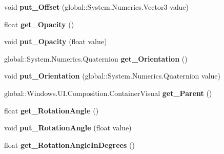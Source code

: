 \begin{DoxyCompactItemize}
void {\bfseries put\+\_\+\+Offset} (global\+::\+System.\+Numerics.\+Vector3 value)
\item 
\mbox{\label{interface_windows_1_1_u_i_1_1_composition_1_1_i_visual_ac8734d1872440f36e957ad510227446a}} 
float {\bfseries get\+\_\+\+Opacity} ()
\item 
\mbox{\label{interface_windows_1_1_u_i_1_1_composition_1_1_i_visual_ad61a737c8ccc4148e0134f10292f5708}} 
void {\bfseries put\+\_\+\+Opacity} (float value)
\item 
\mbox{\label{interface_windows_1_1_u_i_1_1_composition_1_1_i_visual_a523dd4814f2f36f236cfe45314be2dd0}} 
global\+::\+System.\+Numerics.\+Quaternion {\bfseries get\+\_\+\+Orientation} ()
\item 
\mbox{\label{interface_windows_1_1_u_i_1_1_composition_1_1_i_visual_ac0ab83605b6773e888073ad16337ad3f}} 
void {\bfseries put\+\_\+\+Orientation} (global\+::\+System.\+Numerics.\+Quaternion value)
\item 
\mbox{\label{interface_windows_1_1_u_i_1_1_composition_1_1_i_visual_a134bed2c4c5639f5afd9a8ea755bd39a}} 
global\+::\+Windows.\+U\+I.\+Composition.\+Container\+Visual {\bfseries get\+\_\+\+Parent} ()
\item 
\mbox{\label{interface_windows_1_1_u_i_1_1_composition_1_1_i_visual_abefcdbefc02e45c1a846f29a0b173f5d}} 
float {\bfseries get\+\_\+\+Rotation\+Angle} ()
\item 
\mbox{\label{interface_windows_1_1_u_i_1_1_composition_1_1_i_visual_a57dea19f8a26f8727219fb97a7df55e7}} 
void {\bfseries put\+\_\+\+Rotation\+Angle} (float value)
\item 
\mbox{\label{interface_windows_1_1_u_i_1_1_composition_1_1_i_visual_aff19cf9eed640a1a17a06464d5ccc102}} 
float {\bfseries get\+\_\+\+Rotation\+Angle\+In\+Degrees} ()

\end{DoxyCompactItemize}
